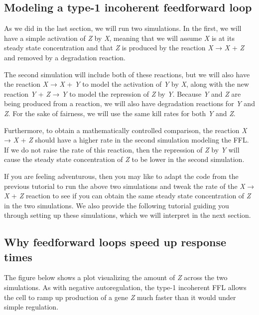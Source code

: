 \FloatBarrier
{}
\subsection{Modeling a type-1 incoherent feedforward loop}

As we did in the last section, we will run two simulations. In the first, we will have a simple activation of \textit{Z} by \textit{X}, meaning that we will assume \textit{X} is at its steady state concentration and that \textit{Z} is produced by the reaction \textit{X} → \textit{X} + \textit{Z} and removed by a degradation reaction.

The second simulation will include both of these reactions, but we will also have the reaction \textit{X} → \textit{X} + \textit{Y} to model the activation of \textit{Y} by \textit{X}, along with the new reaction \textit{Y} + \textit{Z} → \textit{Y} to model the repression of \textit{Z} by \textit{Y}. Because \textit{Y} and \textit{Z} are being produced from a reaction, we will also have degradation reactions for \textit{Y} and \textit{Z}. For the sake of fairness, we will use the same kill rates for both \textit{Y} and \textit{Z}.

Furthermore, to obtain a mathematically controlled comparison, the reaction \textit{X} → \textit{X} + \textit{Z} should have a higher rate in the second simulation modeling the FFL. If we do not raise the rate of this reaction, then the repression of \textit{Z} by \textit{Y} will cause the steady state concentration of \textit{Z} to be lower in the second simulation.

If you are feeling adventurous, then you may like to adapt the code from the previous tutorial to run the above two simulations and tweak the rate of the \textit{X} → \textit{X} + \textit{Z} reaction to see if you can obtain the same steady state concentration of \textit{Z} in the two simulations. We also provide the following tutorial guiding you through setting up these simulations, which we will interpret in the next section.


\FloatBarrier
{}
\subsection{Why feedforward loops speed up response times}

The figure below shows a plot visualizing the amount of \textit{Z} across the two simulations. As with negative autoregulation, the type-1 incoherent FFL allows the cell to ramp up production of a gene \textit{Z} much faster than it would under simple regulation.

